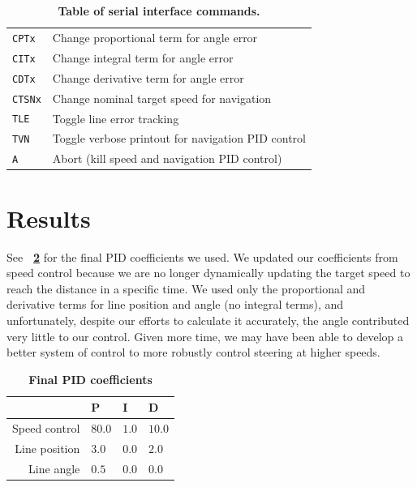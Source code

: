 \documentclass[letterpaper, 11pt]{article}
\newcommand*{\tblref}[1]{\textbf{\tablename~\ref{#1}}}
\begin{document}
\begin{enumerate}[label=\textbf{\arabic*.}]
\begin{table}[ht]
\begin{tabular}{@{}ll@{}}
        \texttt{CPTx} & Change proportional term for angle error \\
        \texttt{CITx} & Change integral term for angle error \\
        \texttt{CDTx} & Change derivative term for angle error \\
        \texttt{CTSNx} & Change nominal target speed for navigation \\
        \texttt{TLE} & Toggle line error tracking \\
        \texttt{TVN} & Toggle verbose printout for navigation PID control \\ \midrule
        \texttt{A} & Abort (kill speed and navigation PID control) \\ \bottomrule
    \end{tabular}
    \caption{\textbf{Table of serial interface commands.}}
    \label{tbl:commands}
\end{table}

\section{Results}
See \tblref{tbl:pid} for the final PID coefficients we used. We updated our coefficients from speed control because we are no longer dynamically updating the target speed to reach the distance in a specific time. We used only the proportional and derivative terms for line position and angle (no integral terms), and unfortunately, despite our efforts to calculate it accurately, the angle contributed very little to our control. Given more time, we may have been able to develop a better system of control to more robustly control steering at higher speeds.
\begin{table}[ht]
    \centering
    \begin{tabular}{@{}rlll@{}}
        \toprule
        & \textbf{P} & \textbf{I} & \textbf{D} \\ \midrule
        Speed control & $80.0$ & $1.0$ & $10.0$ \\
        Line position & $3.0$ & $0.0$ & $2.0$ \\
        Line angle & $0.5$ & $0.0$ & $0.0$ \\ \bottomrule
    \end{tabular}
    \caption{\textbf{Final PID coefficients}}
    \label{tbl:pid}
\end{table}


\end{enumerate}
\end{document}
